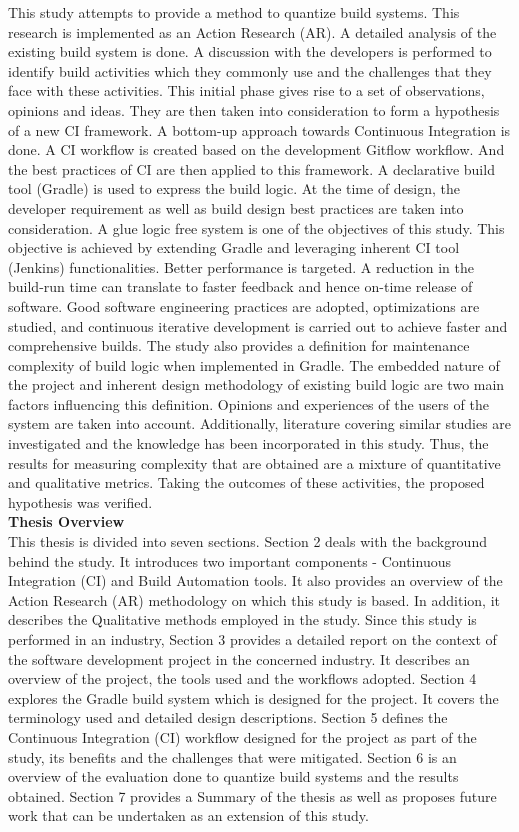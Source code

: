 \documentclass[12pt, a4paper, titlepage]{scrartcl}
\begin{document}
\par This study attempts to provide a method to quantize build systems. This research is implemented as an Action Research (AR). A detailed analysis of the existing build system is done. A discussion with the developers is performed to identify build activities which they commonly use and the challenges that they face with these activities. This initial phase gives rise to a set of observations, opinions and ideas. They are then taken into consideration to form a hypothesis of a new CI framework. A bottom-up approach towards Continuous Integration is done. A CI workflow is created based on the development Gitflow workflow. And the best practices of CI are then applied to this framework. A declarative build tool (Gradle) is used to express the build logic. At the time of design, the developer requirement as well as build design best practices are taken into consideration. A glue logic free system is one of the objectives of this study. This objective is achieved by extending Gradle and leveraging inherent CI tool (Jenkins) functionalities. Better performance is targeted. A reduction in the build-run time can translate to faster feedback and hence on-time release of software. Good software engineering practices are adopted, optimizations are studied, and continuous iterative development is carried out to achieve faster and comprehensive builds. The study also provides a definition for maintenance complexity of build logic when implemented in Gradle. The embedded nature of the project and inherent design methodology of existing build logic are two main factors influencing this definition. Opinions and experiences of the users of the system are taken into account. Additionally, literature covering similar studies are investigated and the knowledge has been incorporated in this study. Thus, the results for measuring complexity that are obtained are a mixture of quantitative and qualitative metrics. Taking the outcomes of these activities, the proposed hypothesis was verified. 
\\
\linebreak
\textbf{Thesis Overview} \\
This thesis is divided into seven sections. Section 2 deals with the background behind the study. It introduces two important components - Continuous Integration (CI) and Build Automation tools. It also provides an overview of the Action Research (AR) methodology on which this study is based. In addition, it describes the Qualitative methods employed in the study. Since this study is performed in an industry, Section 3 provides a detailed report on the context of the software development project in the concerned industry. It describes an overview of the project, the tools used and the workflows adopted. Section 4 explores the Gradle build system which is designed for the project. It covers the terminology used and detailed design descriptions. Section 5 defines the Continuous Integration (CI) workflow designed for the project as part of the study, its benefits and the challenges that were mitigated. Section 6 is an overview of the evaluation done to quantize build systems and the results obtained. Section 7 provides a Summary of the thesis as well as proposes future work that can be undertaken as an extension of this study. 
\pagebreak
\end{document}
